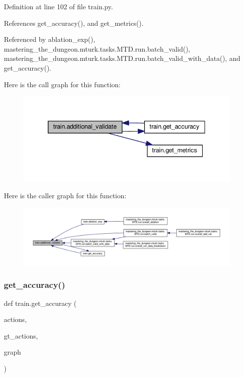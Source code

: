 Definition at line 102 of file train.\+py.



References get\+\_\+accuracy(), and get\+\_\+metrics().



Referenced by ablation\+\_\+exp(), mastering\+\_\+the\+\_\+dungeon.\+mturk.\+tasks.\+M\+T\+D.\+run.\+batch\+\_\+valid(), mastering\+\_\+the\+\_\+dungeon.\+mturk.\+tasks.\+M\+T\+D.\+run.\+batch\+\_\+valid\+\_\+with\+\_\+data(), and get\+\_\+accuracy().

Here is the call graph for this function\+:
\nopagebreak
\begin{figure}[H]
\begin{center}
\leavevmode
\includegraphics[width=332pt]{namespacetrain_a9719cda8ba718637950ea11259aa636c_cgraph}
\end{center}
\end{figure}
Here is the caller graph for this function\+:
\nopagebreak
\begin{figure}[H]
\begin{center}
\leavevmode
\includegraphics[width=350pt]{namespacetrain_a9719cda8ba718637950ea11259aa636c_icgraph}
\end{center}
\end{figure}
\mbox{\label{namespacetrain_a55c2b31c8e13b7aa621b3954392bdb93}} 
\subsubsection{\texorpdfstring{get\+\_\+accuracy()}{get\_accuracy()}}
{\footnotesize\ttfamily def train.\+get\+\_\+accuracy (\begin{DoxyParamCaption}\item[{}]{actions,  }\item[{}]{gt\+\_\+actions,  }\item[{}]{graph }\end{DoxyParamCaption})}



